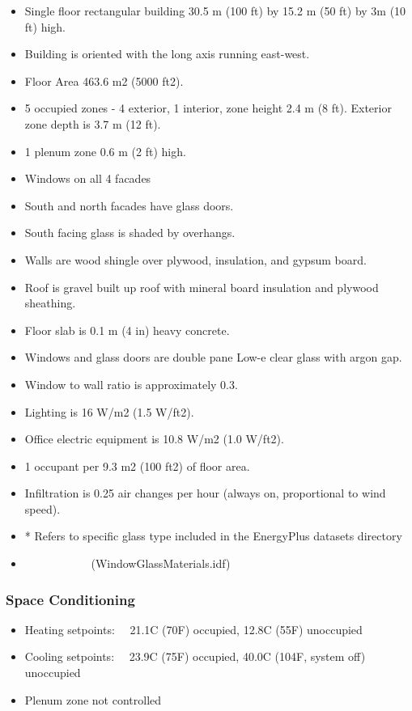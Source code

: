 \begin{itemize}
\item
  Single floor rectangular building 30.5 m (100 ft) by 15.2 m (50 ft) by 3m (10 ft) high.
\item
  Building is oriented with the long axis running east-west.
\item
  Floor Area 463.6 m2 (5000 ft2).
\item
  5 occupied zones - 4 exterior, 1 interior, zone height 2.4 m (8 ft). Exterior zone depth is 3.7 m (12 ft).
\item
  1 plenum zone 0.6 m (2 ft) high.
\item
  Windows on all 4 facades
\item
  South and north facades have glass doors.
\item
  South facing glass is shaded by overhangs.
\item
  Walls are wood shingle over plywood, insulation, and gypsum board.
\item
  Roof is gravel built up roof with mineral board insulation and plywood sheathing.
\item
  Floor slab is 0.1 m (4 in) heavy concrete.
\item
  Windows and glass doors are double pane Low-e clear glass with argon gap.
\item
  Window to wall ratio is approximately 0.3.
\item
  Lighting is 16 W/m2 (1.5 W/ft2).
\item
  Office electric equipment is 10.8 W/m2 (1.0 W/ft2).
\item
  1 occupant per 9.3 m2 (100 ft2) of floor area.
\item
  Infiltration is 0.25 air changes per hour (always on, proportional to wind speed).
\item
  * Refers to specific glass type included in the EnergyPlus datasets directory
\item
  ~~~~~~~~~~~ (WindowGlassMaterials.idf)
\end{itemize}

\subsubsection{Space Conditioning}\label{space-conditioning}

\begin{itemize}
\item
  Heating setpoints:~~ 21.1C (70F) occupied, 12.8C (55F) unoccupied
\item
  Cooling setpoints:~~ 23.9C (75F) occupied, 40.0C (104F, system off) unoccupied
\item
  Plenum zone not controlled
\end{itemize}

